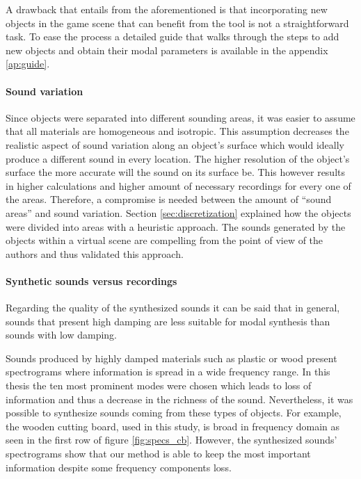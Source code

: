 A drawback that entails from the aforementioned is that incorporating new objects in the game scene that can benefit from the tool is not a straightforward task. To ease the process a detailed guide that walks through the steps to add new objects and obtain their modal parameters is available in the appendix \ref{ap:guide}. 

\paragraph{Sound variation}
Since objects were separated into different sounding areas, it was easier to assume that all materials are homogeneous and isotropic. This assumption decreases the realistic aspect of sound variation along an object's surface which would ideally produce a different sound in every location. The higher resolution of the object's surface the more accurate will the sound on its surface be. This however results in higher calculations and higher amount of necessary recordings for every one of the areas. Therefore, a compromise is needed between the amount of ``sound areas'' and sound variation. Section \ref{sec:discretization} explained how the objects were divided into areas with a heuristic approach. The sounds generated by the objects within a virtual scene are compelling from the point of view of the authors and thus validated this approach.



\paragraph{Synthetic sounds versus recordings\\}

Regarding the quality of the synthesized sounds it can be said that in general, sounds that present high damping are less suitable for modal synthesis than sounds with low damping. 

Sounds produced by highly damped materials such as plastic or wood present spectrograms where information is spread in a wide frequency range. In this thesis the ten most prominent modes were chosen which leads to loss of information and thus a decrease in the richness of the sound. Nevertheless, it was possible to synthesize sounds coming from these types of objects. For example, the wooden cutting board, used in this study, is broad in frequency domain as seen in the first row of figure \ref{fig:specs_cb}. However, the synthesized sounds' spectrograms show that our method is able to keep the most important information despite some frequency components loss. 

